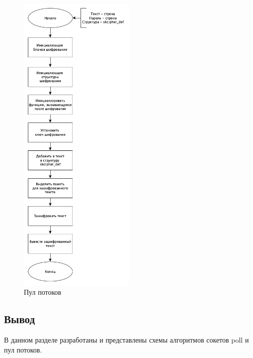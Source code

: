 \begin{figure}[ht!]
	\centering
		\includegraphics[width=0.5\textwidth]{assets/graphs/cipher.png}
		\caption{Пул потоков}
		\label{vlasov:trachnet:menya}
\end{figure}

\subsection*{Вывод}

В данном разделе разработаны и представлены схемы алгоритмов сокетов poll и пул потоков.